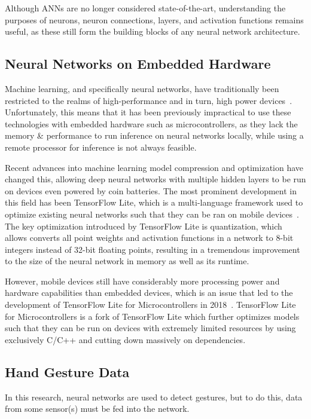 Although ANNs are no longer considered state-of-the-art, understanding the purposes of neurons, neuron connections, layers, and activation functions remains useful, as these still form the building blocks of any neural network architecture.

\subsection{Neural Networks on Embedded Hardware}\label{subsec:neural-networks-on-embedded-hardware}
Machine learning, and specifically neural networks, have traditionally been restricted to the realms of high-performance and in turn, high power devices~\cite{8342164}.
Unfortunately, this means that it has been previously impractical to use these technologies with embedded hardware such as microcontrollers, as they lack the memory \& performance to run inference on neural networks locally, while using a remote processor for inference is not always feasible.

Recent advances into machine learning model compression and optimization have changed this, allowing deep neural networks with multiple hidden layers to be run on devices even powered by coin batteries.
The most prominent development in this field has been TensorFlow Lite, which is a multi-language framework used to optimize existing neural networks such that they can be ran on mobile devices~\cite{MLSYS2021_d2ddea18}.
The key optimization introduced by TensorFlow Lite is quantization, which allows converts all point weights and activation functions in a network to 8-bit integers instead of 32-bit floating points, resulting in a tremendous improvement to the size of the neural network in memory as well as its runtime.

However, mobile devices still have considerably more processing power and hardware capabilities than embedded devices, which is an issue that led to the development of TensorFlow Lite for Microcontrollers in 2018~\cite{MLSYS2021_d2ddea18}.
TensorFlow Lite for Microcontrollers is a fork of TensorFlow Lite which further optimizes models such that they can be run on devices with extremely limited resources by using exclusively C/C++ and cutting down massively on dependencies.

\subsection{Hand Gesture Data}\label{subsec:hand-gesture-data}
In this research, neural networks are used to detect gestures, but to do this, data from some sensor(s) must be fed into the network.

